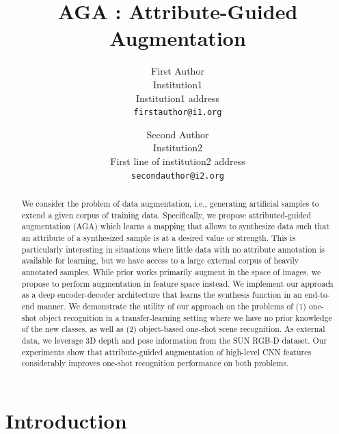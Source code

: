 \documentclass[10pt,twocolumn,letterpaper]{article}
\begin{document}
\title{AGA : Attribute-Guided Augmentation}

\author{First Author\\
Institution1\\
Institution1 address\\
{\tt\small firstauthor@i1.org}
\and
Second Author\\
Institution2\\
First line of institution2 address\\
{\tt\small secondauthor@i2.org}
}

\maketitle

\begin{abstract}
We consider the problem of data augmentation, i.e., generating artificial
samples to extend a given corpus of training data. Specifically, we propose
attributed-guided augmentation (AGA) which learns a mapping
that allows to synthesize data such that an attribute of a synthesized sample 
is at a desired value or strength. This is particularly interesting in situations 
where little data with no attribute annotation is available for learning, but 
we have access to a large external corpus of heavily annotated samples. 
While prior works primarily augment in the space of images,
we propose to perform augmentation in feature space instead.
We implement our approach as a deep encoder-decoder architecture that 
learns the synthesis function in an end-to-end manner. 
We demonstrate the utility of our approach on the problems of (1) 
one-shot object recognition in a transfer-learning setting where
we have no prior knowledge of the new classes, as well as 
(2) object-based one-shot scene recognition.
As external data, we leverage 3D depth and pose information from the 
SUN RGB-D dataset. Our experiments show that attribute-guided augmentation of
high-level CNN features considerably improves one-shot recognition 
performance on both problems.
\end{abstract}

\section{Introduction}
\label{section:introduction}
\end{document}
